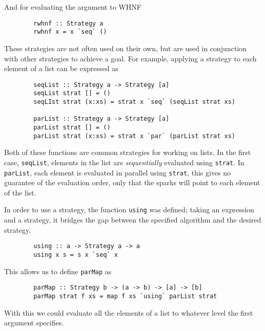 And for evaluating the argument to WHNF

\begin{verbatim}
        rwhnf :: Strategy a
        rwhnf x = x `seq` ()
\end{verbatim}

These strategies are not often used on their own, but are used in conjunction
with other strategies to achieve a goal. For example, applying a strategy to
each element of a list can be expressed as

\begin{verbatim}
        seqList :: Strategy a -> Strategy [a]
        seqList strat [] = ()
        seqLIst strat (x:xs) = strat x `seq` (seqList strat xs)

        parList :: Strategy a -> Strategy [a]
        parList strat [] = ()
        parList strat (x:xs) = strat x `par` (parList strat xs)
\end{verbatim}

Both of these functions are common strategies for working on lists. In the first
case, \verb=seqList=, elements in the list are \emph{sequentially} evaluated
using \verb=strat=. In \verb=parList=, each element is evaluated in parallel
using \verb=strat=, this gives no guarantee of the evaluation order, only that
the sparks will point to each element of the list.

In order to use a strategy, the function \verb=using= was defined; taking an
expression and a strategy, it bridges the gap between the specified algorithm
and the desired strategy.

\begin{verbatim}
        using :: a -> Strategy a -> a
        using x s = s x `seq` x
\end{verbatim}

This allows us to define \verb=parMap= as

\begin{verbatim}
        parMap :: Strategy b -> (a -> b) -> [a] -> [b]
        parMap strat f xs = map f xs `using` parList strat
\end{verbatim}

With this we could evaluate all the elements of a list to whatever level the
first argument specifies.
